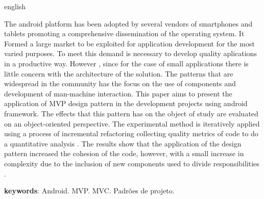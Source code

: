 \documentclass[
	12pt,				%
	openright,			%
	twoside,			%
	a4paper,			%
	english,			%
	french,				%
	spanish,			%
	brazil,				%
	]{abntex2}
\begin{document}
\begin{resumo}[Abstract]
 \begin{otherlanguage*}{english}

The android platform has been adopted by several vendors of smartphones and
tablets promoting a comprehensive dissemination of the operating system.
It Formed a large market to be exploited for application development
for the most varied purposes. To meet this demand is necessary to develop
quality aplications in a productive way. However , since for the case
of small applications there is little concern with the architecture of the solution.
The patterns that are widespread in the community has the focus on the use of
components and development of man-machine interaction. This paper aims to present the
application of MVP design pattern in the development projects using android
framework. The effects that this pattern has on the object of study are
evaluated on an object-oriented perspective. The experimental method is
iteratively applied using a  process of incremental refactoring collecting
quality metrics of code to do a quantitative analysis .
The results show that the application of the design pattern increased the
cohesion of the code, however, with a small increase in complexity due to the inclusion of new
components used to divide responsibilities .

 \vspace{\onelineskip}
    
 \noindent
 \textbf{keywords}: Android. MVP. MVC. Padrões de projeto.
 \end{otherlanguage*}
\end{resumo}

\tableofcontents*
\cleardoublepage

\textual













% 

\postextual




%
%
\end{document}

